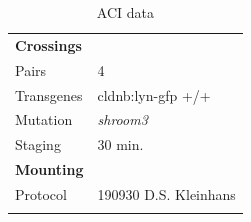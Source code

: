 \documentclass[11pt,singlespacinge,twoside]{reedthesis} %
\begin{document}
\begin{longtable}[]{@{}ll@{}}
\caption{\label{tab:acidata} ACI data}\tabularnewline
\toprule
\endhead
\begin{minipage}[t]{0.21\columnwidth}\raggedright
\textbf{Crossings}\strut
\end{minipage} & \begin{minipage}[t]{0.73\columnwidth}\raggedright
\strut
\end{minipage}\tabularnewline
\begin{minipage}[t]{0.21\columnwidth}\raggedright
Pairs\strut
\end{minipage} & \begin{minipage}[t]{0.73\columnwidth}\raggedright
4\strut
\end{minipage}\tabularnewline
\begin{minipage}[t]{0.21\columnwidth}\raggedright
Transgenes\strut
\end{minipage} & \begin{minipage}[t]{0.73\columnwidth}\raggedright
cldnb:lyn-gfp +/+\strut
\end{minipage}\tabularnewline
\begin{minipage}[t]{0.21\columnwidth}\raggedright
Mutation\strut
\end{minipage} & \begin{minipage}[t]{0.73\columnwidth}\raggedright
\emph{shroom3}\strut
\end{minipage}\tabularnewline
\begin{minipage}[t]{0.21\columnwidth}\raggedright
Staging\strut
\end{minipage} & \begin{minipage}[t]{0.73\columnwidth}\raggedright
30 min.\strut
\end{minipage}\tabularnewline
\begin{minipage}[t]{0.21\columnwidth}\raggedright
\textbf{Mounting}\strut
\end{minipage} & \begin{minipage}[t]{0.73\columnwidth}\raggedright
\strut
\end{minipage}\tabularnewline
\begin{minipage}[t]{0.21\columnwidth}\raggedright
Protocol\strut
\end{minipage} & \begin{minipage}[t]{0.73\columnwidth}\raggedright
190930 D.S. Kleinhans\strut
\end{minipage}\tabularnewline
\begin{minipage}[t]{0.21\columnwidth}\raggedright

\end{minipage}
\end{longtable}
\end{document}
